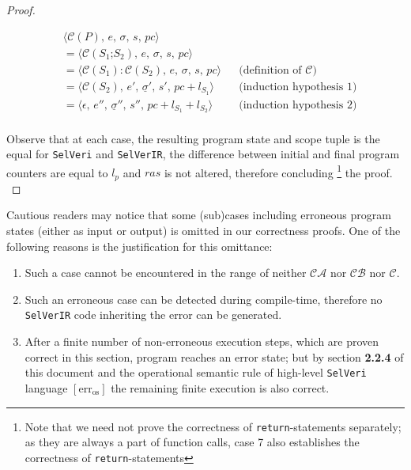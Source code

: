 \documentclass{article}
\begin{document}
\begin{proof}
\begin{itemize}
  \[
      \begin{aligned}
      &\langle \mathcal{C}(P),\, e,\, \sigma,\, s,\, pc \rangle \\
      &= \langle \mathcal{C}(S_1\texttt{;}S_2),\, e,\, \sigma,\, s,\, pc \rangle \\
      &= \langle \mathcal{C}(S_1) : \mathcal{C}(S_2) ,\, e,\, \sigma,\, s,\, pc \rangle
      && \text{(definition of } \mathcal{C}\text{)} \\   
      &= \langle \mathcal{C}(S_2) ,\, e',\, \underline{\sigma}' ,\, s',\, pc + l_{S_1} \rangle
      && \text{(induction hypothesis 1)} \\   
      &= \langle \epsilon ,\, e'',\, \underline{\sigma}'' ,\, s'',\, pc + l_{S_1} + l_{S_2} \rangle
      && \text{(induction hypothesis 2)} \\ 
      \end{aligned}
  \]

  
    

\end{itemize}

Observe that at each case, the resulting program state and scope tuple is the equal for \texttt{SelVeri} and \texttt{SelVerIR}, the difference between initial and final program counters are equal to $l_p$ and $ras$ is not altered, therefore concluding \footnote{Note that we need not prove the correctness of \texttt{return}-statements separately; as they are always a part of function calls, case 7 also establishes the correctness of \texttt{return}-statements} the proof.
\\
\end{proof}

Cautious readers may notice that some (sub)cases including erroneous program states (either as input or output) is omitted in our correctness proofs. One of the following reasons is the justification for this omittance:

\begin{enumerate}
    \item Such a case cannot be encountered in the range of neither $\mathcal{CA}$ nor $\mathcal{CB}$ nor $\mathcal{C}$.

    \item Such an erroneous case can be detected during compile-time, therefore no \texttt{SelVerIR} code inheriting the error can be generated.

    \item After a finite number of non-erroneous execution steps, which are proven correct in this section, program reaches an error state; but by section \textbf{2.2.4} of this document and the operational semantic rule of high-level \texttt{SelVeri} language $[ \text{err}_{\text{os}} ]$ the remaining finite execution is also correct.
\end{enumerate}
\end{document}
